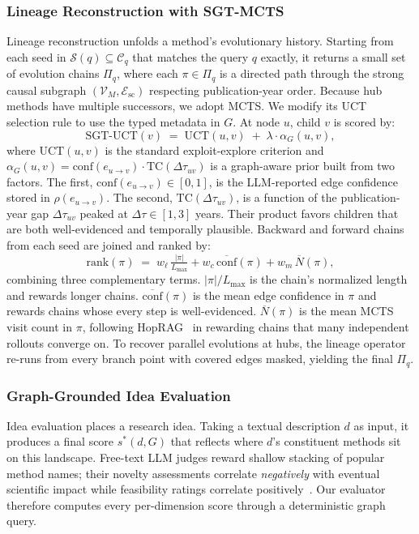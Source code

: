 \documentclass{llmxive}
\begin{document}
\subsubsection{Lineage Reconstruction with SGT-MCTS}
\label{sec:lineage}
Lineage reconstruction unfolds a method's evolutionary history. Starting from each seed in $\mathcal{S}(q) \subseteq \mathcal{C}_q$ that matches the query $q$ exactly, it returns a small set of evolution chains $\Pi_q$, where each $\pi \in \Pi_q$ is a directed path through the strong causal subgraph $(\mathcal{V}_M, \mathcal{E}_{\text{sc}})$ respecting publication-year order. Because hub methods have multiple successors, we adopt MCTS. We modify its UCT~\cite{kocsis2006bandit} selection rule to use the typed metadata in $G$. At node $u$, child $v$ is scored by:
\begin{equation}
\mathrm{SGT\text{-}UCT}(v) \;=\; \mathrm{UCT}(u, v) \;+\; \lambda \cdot \alpha_G(u, v),
\label{eq:sgt-uct}
\end{equation}
where $\mathrm{UCT}(u, v)$ is the standard exploit-explore criterion and $\alpha_G(u, v) = \mathrm{conf}(e_{u\to v})
\cdot \mathrm{TC}(\Delta\tau_{uv})$ is a graph-aware prior built from two factors. The first, $\mathrm{conf}(e_{u\to
v}) \in [0, 1]$, is the LLM-reported edge confidence stored in $\rho(e_{u\to v})$. The second,
$\mathrm{TC}(\Delta\tau_{uv})$, is a function of the publication-year gap $\Delta\tau_{uv}$ peaked at $\Delta\tau \in
[1, 3]$ years. Their product favors children that are both well-evidenced and temporally plausible. Backward and forward chains from each seed are joined and ranked by:
\begin{equation}
\mathrm{rank}(\pi) \;=\; w_\ell\,\tfrac{|\pi|}{L_{\max}} + w_c\,\overline{\mathrm{conf}}(\pi) +
w_m\,\overline{N}(\pi),
\label{eq:rank}
\end{equation}
combining three complementary terms. $|\pi|/L_{\max}$ is the chain's normalized length and rewards longer chains. $\overline{\mathrm{conf}}(\pi)$ is the mean edge confidence in $\pi$ and rewards chains whose every step is well-evidenced. $\overline{N}(\pi)$ is the mean MCTS visit count in $\pi$, following HopRAG~\cite{liu2025hoprag} in rewarding chains that many independent rollouts converge on. To recover parallel evolutions at hubs, the lineage operator re-runs from every branch point with covered edges masked, yielding
 the final $\Pi_q$.


\subsubsection{Graph-Grounded Idea Evaluation}
\label{sec:eval}
Idea evaluation places a research idea. Taking a textual description $d$ as input, it produces a final score $s^*(d, G)$ that reflects where $d$'s constituent methods sit on this landscape. Free-text LLM judges reward shallow stacking of popular method names; their novelty assessments correlate \emph{negatively} with eventual scientific impact while feasibility ratings correlate positively~\cite{latimer2025hindsight, gu2024generation}. Our evaluator therefore computes every per-dimension score through a deterministic graph query.
\end{document}
